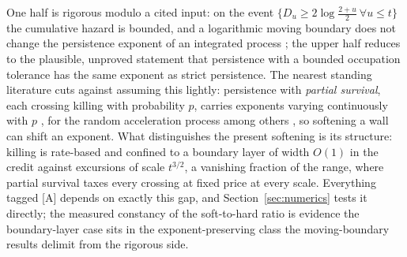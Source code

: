 One half is rigorous modulo a cited input: on the event
$\{D_u\ge2\log\frac{2+u}{2}\ \forall u\le t\}$ the cumulative hazard
is bounded, and a logarithmic moving boundary does not change the
persistence exponent of an integrated process \cite{AS15,DW15}; the
upper half reduces to the plausible, unproved statement that
persistence with a bounded occupation tolerance has the same exponent
as strict persistence. The nearest standing literature cuts against
assuming this lightly: persistence with \emph{partial survival}, each crossing killing with probability $p$, carries exponents
varying continuously with $p$ \cite{MB98}, for the random acceleration
process among others \cite{Bur14}, so softening a wall can shift an
exponent. What distinguishes the present softening is its structure:
killing is rate-based and confined to a boundary layer of width $O(1)$
in the credit against excursions of scale $t^{3/2}$, a vanishing
fraction of the range, where partial survival taxes every crossing
at fixed price at every scale. Everything tagged [A] depends on exactly
this gap, and Section~\ref{sec:numerics} tests it directly; the
measured constancy of the soft-to-hard ratio is evidence the
boundary-layer case sits in the exponent-preserving class the
moving-boundary results delimit from the rigorous side.

